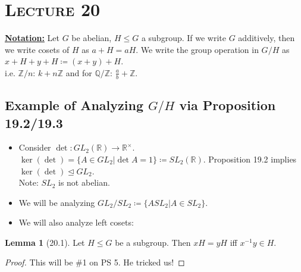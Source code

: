\documentclass{article}
\newcommand{\Z}{\mathbb{Z}}
\newcommand{\Q}{\mathbb{Q}}
\newcommand{\R}{\mathbb{R}}
\newcommand{\coleq}{\coloneqq}
\newcommand{\inverse}[1]{#1^{-1}}
\newcommand{\define}[1]{\textbf{\underline{#1}}}
\newcommand{\func}[3]{#1: #2 \to #3}
\theoremstyle{definition}
\newtheorem*{lem}{Lemma}
\theoremstyle{remark}
\newcommand{\Rx}{\mathbb{R}^\times}
\newcommand{\normal}{\unlhd}
\begin{document}
    \noindent\section*{\textbf{\textsc{Lecture 20}}}{
        \define{Notation:} Let $G$ be abelian, $H\leq G$ a subgroup. If we write $G$ additively, then we write cosets of $H$ as $a+H=aH$. We write the group operation in $G/H$ as $x+H+y+H\coleq (x+y)+H$.\\
        i.e. $\Z/n$: $k+n\Z$ and for $\Q/\Z$: $\frac{a}{b}+\Z$.
        
        \subsection*{Example of Analyzing $G/H$ via Proposition 19.2/19.3}{
            \begin{itemize}
                \item Consider $\func{\det}{GL_2(\R)}{\Rx}$.\\
                $\ker(\det)=\{A\in GL_2|\det A =1\}\coleq SL_2(\R)$. Proposition 19.2 implies $\ker(\det)\normal GL_2$.\\
                Note: $SL_2$ is not abelian.
                \item We will be analyzing $GL_2/SL_2\coleq\{ASL_2|A\in SL_2\}$.
                \item We will also analyze left cosets:
            \end{itemize}
            
            \begin{lem}[20.1]
                Let $H\leq G$ be a subgroup. Then $xH=yH$ iff $\inverse{x}y\in H$.
            \end{lem}
            
            \begin{proof}
                This will be \#1 on PS 5. He tricked us!
            \end{proof}
            
}}
\end{document}
